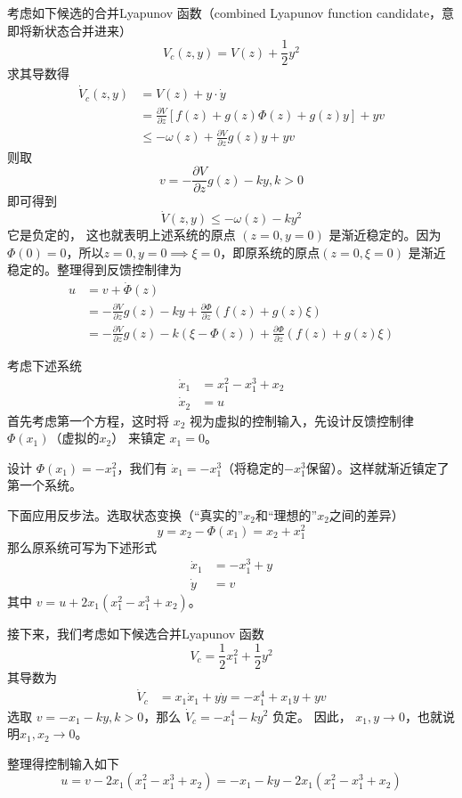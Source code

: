 考虑如下候选的合并Lyapunov 函数（combined Lyapunov function candidate，意即将新状态合并进来）
\[ V_c (z, y) = V (z) + \frac{1}{2} y^2 \]
求其导数得
\begin{align*}
  \dot{V}_c (z, y) & = V (z) + y \cdot \dot{y}\\
  & = \frac{\partial V}{\partial z} [f (z) + g (z) \Phi (z) + g (z) y] + y 
  v\\
  & \leq - \omega (z) + \frac{\partial V}{\partial z} g (z) y + y  v
\end{align*}
则取 \[v = - \frac{\partial V}{\partial z} g (z) - k  y, k > 0\]
即可得到\[\dot{V} (z, y) \leq - \omega (z) - k  y^2\]
它是负定的，
这也就表明上述系统的原点 $(z = 0, y = 0)$ 是渐近稳定的。因为
$\Phi (0) = 0$，所以$z = 0, y = 0\implies \xi =0$，即原系统的原点$(z = 0, \xi = 0)$ 是渐近稳定的。整理得到反馈控制律为
\begin{align*}
  u & = v + \dot{\Phi}(z)\\
  & = - \frac{\partial V}{\partial z} g (z) - k  y + \frac{\partial
  \Phi}{\partial z} (f (z) + g (z) \xi)\\
  & = - \frac{\partial V}{\partial z} g (z) - k  (\xi - \Phi (z)) +
  \frac{\partial \Phi}{\partial z} (f (z) + g (z) \xi)
\end{align*}
\begin{example}[利用反步法进行非线性系统设计]
  考虑下述系统
  \begin{align*}
    \dot{x}_1 & = x^2_1 - x^3_1 + x_2\\
    \dot{x}_2 & = u
  \end{align*}
 首先考虑第一个方程，这时将 $x_2$ 视为虚拟的控制输入，先设计反馈控制律 $\Phi (x_1)$（虚拟的$x_2$） 来镇定 $x_1 = 0$。
  
  设计 $\Phi (x_1) = - x^2_1$，我们有 $\dot{x}_1 = - x^3_1$（将稳定的$- x^3_1$保留）。这样就渐近镇定了第一个系统。
  
  下面应用反步法。选取状态变换（“真实的”$x_2$和“理想的”$x_2$之间的差异）
  \[ y = x_2 - \Phi (x_1) = x_2 + x^2_1 \]
  那么原系统可写为下述形式
  \begin{align*}
    \dot{x}_1 & = - x^3_1 + y\\
    \dot{y}  & = v
  \end{align*}
  其中 $v = u + 2 x_1 (x^2_1 - x^3_1 + x_2)$。
  
  接下来，我们考虑如下候选合并Lyapunov 函数
  \[ V_c = \frac{1}{2} x^2_1 + \frac{1}{2} y^2 \]
  其导数为
  \begin{align*}
    \dot{V}_c & = x_1 \dot{x}_1 + y  \dot{y} = - x^4_1 + x_1 y + y  v
  \end{align*}
  选取 $v = - x_1 - k  y, k > 0$，那么 $\dot{V}_c = - x^4_1 - k  y^2$ 负定。
  因此， $x_1, y \rightarrow 0$，也就说明$x_1,x_2\rightarrow 0$。
  
  整理得控制输入如下
  \[ u = v - 2 x_1 (x^2_1 - x^3_1 + x_2) = - x_1 - k  y - 2 x_1 (x^2_1 - x^3_1
     + x_2) \]
\end{example}

